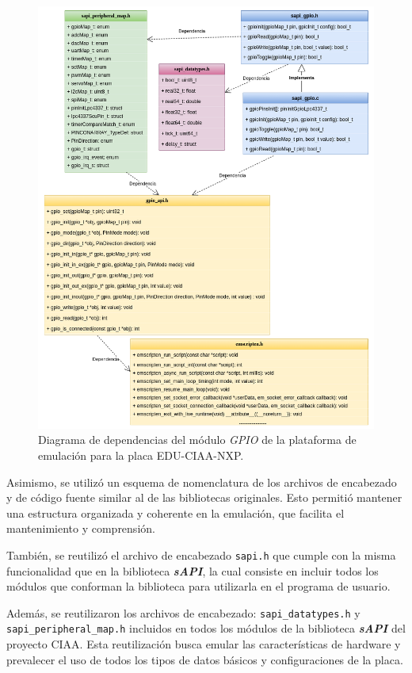 \begin{figure}[ht]
	\centering
	\includegraphics[scale=.41]{./Figures/DiagramaClasesEmulador.png}
	\caption{Diagrama de dependencias del módulo \textit{GPIO} de la plataforma de emulación para la placa EDU-CIAA-NXP.}
	\label{fig:GPIOEmulador}
\end{figure}


Asimismo, se utilizó un esquema de nomenclatura de los archivos de encabezado y de código fuente similar al de las bibliotecas originales.  Esto permitió mantener una estructura organizada y coherente en la emulación, que facilita el mantenimiento y comprensión.


También, se reutilizó el archivo de encabezado \texttt{sapi.h} que cumple con la misma funcionalidad que en la biblioteca \textit{\textbf{sAPI}}, la cual consiste en incluir todos los módulos que conforman la biblioteca para utilizarla en el programa de usuario. 

Además, se reutilizaron los archivos de encabezado: \texttt{sapi\_datatypes.h} y \newline \texttt{sapi\_peripheral\_map.h} incluidos en todos los módulos de la biblioteca \textit{\textbf{sAPI}} del proyecto CIAA. Esta reutilización busca emular las características de hardware y prevalecer el uso de todos los tipos de datos básicos y configuraciones de la placa.

